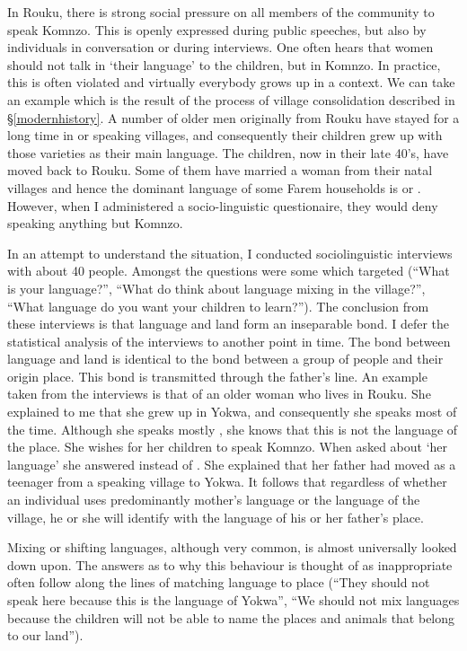 In Rouku, there is strong social pressure on all members of the community to speak Komnzo. This is openly expressed during public speeches, but also by individuals in conversation or during interviews. One often hears that women should not talk in `their language' to the children, but in Komnzo. In practice, this is often violated and virtually everybody grows up in a  context. We can take an example which is the result of the process of village consolidation described in \S\ref{modernhistory}. A number of older men originally from Rouku have stayed for a long time in  or  speaking villages, and consequently their children grew up with those varieties as their main language. The children, now in their late 40's, have moved back to Rouku. Some of them have married a woman from their natal villages and hence the dominant language of some Farem households is  or . However, when I administered a socio-linguistic questionaire, they would deny speaking anything but Komnzo.%

In an attempt to understand the situation, I conducted sociolinguistic interviews with about 40 people. Amongst the questions were some which targeted  (``What is your language?'', ``What do think about language mixing in the village?'', ``What language do you want your children to learn?''). The conclusion from these interviews is that language and land form an inseparable bond. I defer the statistical analysis of the interviews to another point in time. The bond between language and land is identical to the bond between a group of people and their origin place. This bond is transmitted through the father's line. An example taken from the interviews is that of an older woman who lives in Rouku. She explained to me that she grew up in Yokwa, and consequently she speaks  most of the time. Although she speaks mostly , she knows that this is not the language of the place. She wishes for her children to speak Komnzo. When asked about `her language' she answered  instead of . She explained that her father had moved as a teenager from a  speaking village to Yokwa. It follows that regardless of whether an individual uses predominantly mother's language or the language of the village, he or she will identify with the language of his or her father's place.%

Mixing or shifting languages, although very common, is almost universally looked down upon. The answers as to why this behaviour is thought of as inappropriate often follow along the lines of matching language to place (``They should not speak  here because this is the language of Yokwa'', ``We should not mix languages because the children will not be able to name the places and animals that belong to our land'').%

